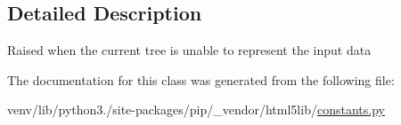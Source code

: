 \subsection{Detailed Description}
\begin{DoxyVerb}Raised when the current tree is unable to represent the input data\end{DoxyVerb}
 

The documentation for this class was generated from the following file\+:\begin{DoxyCompactItemize}
\item 
venv/lib/python3./site-\/packages/pip/\+\_\+vendor/html5lib/\hyperlink{pip_2__vendor_2html5lib_2constants_8py}{constants.\+py}\end{DoxyCompactItemize}
